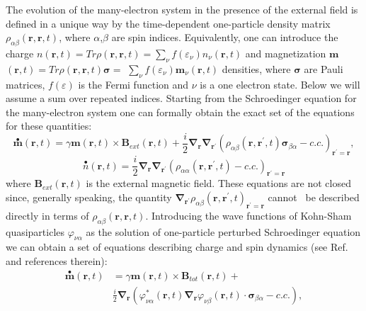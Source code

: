 \documentclass[aps,preprint,twocolumn,10pt]{revtex4}%
\begin{document}
The evolution of the many-electron system in the presence of the external
field is defined in a unique way by the time-dependent one-particle density
matrix $\rho_{\alpha\beta}\left(  \mathbf{r,r,}t\right)  $, where $\alpha
$,$\beta$ are spin indices. Equivalently, one can introduce the charge
$n\left(  \mathbf{r,}t\right)  =Tr\rho\left(  \mathbf{r,r},t\right)
=\sum_{\nu}f\left(  \varepsilon_{\nu}\right)  n_{\nu}\left(  \mathbf{r}%
,t\right)  $ and magnetization $\mathbf{m}$ $\left(  \mathbf{r,}t\right)
=Tr\rho\left(  \mathbf{r,r},t\right)  \mathbf{\sigma=}$ $\sum_{\nu}f\left(
\varepsilon_{\nu}\right)  \mathbf{m}_{\nu}\left(  \mathbf{r},t\right)  $
densities, where $\mathbf{\sigma}$ are Pauli matrices, $f\left(
\varepsilon\right)  $ is the Fermi function and $\nu$ is a one electron state.
Below we will assume a sum over repeated indices. Starting from the
Schroedinger equation for the many-electron system one can formally obtain the
exact set of the equations for these quantities:
\begin{equation}
\overset{\bullet}{\mathbf{m}}(\mathbf{r,}t)=\gamma\mathbf{m}(\mathbf{r,}%
t)\times\mathbf{B}_{ext}(\mathbf{r,}t)+\frac{i}{2}\mathbf{\nabla}_{\mathbf{r}%
}\mathbf{\nabla}_{\mathbf{r}^{\prime}}(\rho_{\alpha\beta}\left(
\mathbf{r,r}^{\prime}\mathbf{,}t\right)  \mathbf{\sigma}_{\beta\alpha
}-c.c.)_{\mathbf{r}^{\prime}=\mathbf{r}},\label{mexac}%
\end{equation}%
\begin{equation}
\overset{\bullet}{n}(\mathbf{r,}t)=\frac{i}{2}\mathbf{\nabla}_{\mathbf{r}%
}\mathbf{\nabla}_{\mathbf{r}^{\prime}}(\rho_{\alpha\alpha}\left(
\mathbf{r,r}^{\prime}\mathbf{,}t\right)  -c.c.)_{\mathbf{r}^{\prime
}=\mathbf{r}}\label{nexac}%
\end{equation}
where $\mathbf{B}_{ext}(\mathbf{r,}t)$ is the external magnetic field. These
equations are not closed since, generally speaking, the quantity
$\mathbf{\nabla}_{\mathbf{r}^{\prime}}\rho_{\alpha\beta}\left(  \mathbf{r,r}%
^{\prime}\mathbf{,}t\right)  _{\mathbf{r}^{\prime}=\mathbf{r}}$ cannot \ be
described directly in terms of $\rho_{\alpha\beta}\left(  \mathbf{r,r,}%
t\right)  $. Introducing the wave functions of Kohn-Sham quasiparticles
$\varphi_{\nu\alpha}$ as the solution of one-particle perturbed Schroedinger
equation we can obtain a set of equations describing charge and spin dynamics
(see Ref.\cite{SD,REV,SAGA} and references therein):
\begin{align}
\overset{\bullet}{\mathbf{m}}(\mathbf{r,}t) &  =\gamma\mathbf{m}%
(\mathbf{r,}t)\times\mathbf{B}_{tot}(\mathbf{r,}t)+\label{mDF}\\
&  \frac{i}{2}\mathbf{\nabla}_{\mathbf{r}}(\varphi_{\nu\alpha}^{\ast}\left(
\mathbf{r,}t\right)  \mathbf{\nabla}_{\mathbf{r}}\varphi_{\nu\beta}\left(
\mathbf{r,}t\right)  \cdot\mathbf{\sigma}_{\beta\alpha}-c.c.),\nonumber
\end{align}%
\end{document}
